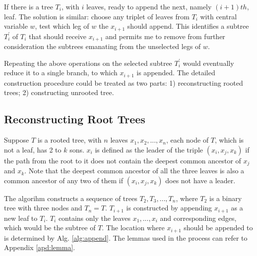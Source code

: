 \documentclass[12pt,a4paper]{article}
\theoremstyle{definition}
\begin{document}
\vspace{0.008\linewidth}
If there is a tree $T_i$, with $i$ leaves, ready to append the next, namely $(i + 1)th$, leaf. The solution is similar: choose any triplet of leaves from $T_i$ with central variable $w$, test which leg of $w$ the $x_{i+1}$ should append. This identifies a subtree $T_i^{'}$ of $T_i$ that should receive $x_{i+1}$ and permits me to remove from further consideration the subtrees emanating from the unselected legs of $w$.

\vspace{0.008\linewidth}
Repeating the above operations on the selected subtree $T_i^{'}$ would eventually reduce it to a single branch, to which $x_{i+1}$ is appended. The detailed construction procedure could be treated as two parts: 1) reconstructing rooted trees; 2) constructing unrooted tree.

\vspace{-0.02\linewidth}
\subsection{Reconstructing Root Trees}

Suppose $T$ is a rooted tree, with $n$ leaves $x_1, x_2, ... , x_n$, each node of $T$, which is not a leaf, has 2 to $k$ sons. $x_i$ is defined as the leader of the triple $(x_i, x_j, x_k)$ if the path from the root to it does not contain the deepest common ancestor of $x_j$ and $x_k$. Note that the deepest common ancestor of all the three leaves is also a common ancestor of any two of them if $(x_i, x_j, x_k)$ does not have a leader.

\vspace{0.008\linewidth}
The algorihm constructs a sequence of trees $T_2, T_3, ... , T_n$, where $T_2$ is a binary tree with three nodes and $T_n=T$. $T_{i+1}$ is constructed by appending $x_{i+1}$ as a new leaf to $T_i$. $T_i$ contains only the leaves $x_1, ... , x_i$ and corresponding edges, which would be the subtree of $T$. The location where $x_{i+1}$ should be appended to is determined by Alg. \ref{alg:append}. The lemmas used in the process can refer to Appendix \ref{apd:lemma}.
\end{document}
